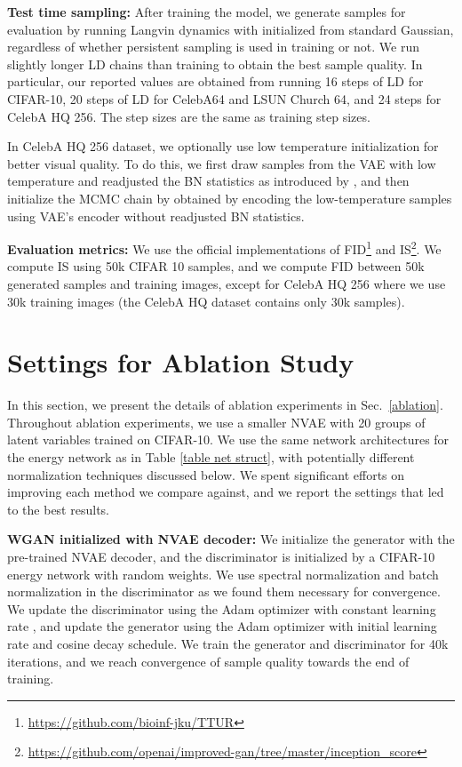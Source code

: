 \documentclass{article} \usepackage{iclr2021_conference,times}
\begin{document}
\textbf{Test time sampling: }After training the model, we generate samples for evaluation by running Langvin dynamics with  initialized from standard Gaussian, regardless of whether persistent sampling is used in training or not. We run slightly longer LD chains than training to obtain the best sample quality. In particular, our reported values are obtained from running 16 steps of LD for CIFAR-10, 20 steps of LD for CelebA64 and LSUN Church 64, and 24 steps for CelebA HQ 256. The step sizes are the same as training step sizes. 

In CelebA HQ 256 dataset, we optionally use low temperature initialization for better visual quality. To do this, we first draw samples from the VAE with low temperature and readjusted the BN statistics as introduced by \citet{vahdat2020nvae}, and then initialize the MCMC chain by  obtained by encoding the low-temperature samples using VAE's encoder without readjusted BN statistics.

\textbf{Evaluation metrics: }We use the official implementations of FID\footnote{\url{https://github.com/bioinf-jku/TTUR}} and IS\footnote{\url{https://github.com/openai/improved-gan/tree/master/inception_score}}. We compute IS using 50k CIFAR 10 samples, and we compute FID between 50k generated samples and training images, except for CelebA HQ 256 where we use 30k training images (the CelebA HQ dataset contains only 30k samples).

\section{Settings for Ablation Study} \label{ablation setting}
In this section, we present the details of ablation experiments in Sec.~\ref{ablation}. Throughout ablation experiments, we use a smaller NVAE with 20 groups of latent variables trained on CIFAR-10. We use the same network architectures for the energy network as in Table \ref{table net struct}, with potentially different normalization techniques discussed below. We spent significant efforts on improving each method we compare against, and we report the settings that led to the best results. 

\textbf{WGAN initialized with NVAE decoder: }We initialize the generator with the pre-trained NVAE decoder, and the discriminator is initialized by a CIFAR-10 energy network with random weights. We use spectral normalization and batch normalization in the discriminator as we found them necessary for convergence. We update the discriminator using the Adam optimizer with constant learning rate , and update the generator using the Adam optimizer with initial learning rate  and cosine decay schedule. We train the generator and discriminator for 40k iterations, and we reach convergence of sample quality towards the end of training. 
\end{document}
